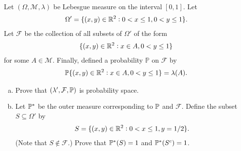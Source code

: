 \begin{problem}
	Let $ (\Omega, \mathcal{M},\lambda) $ be Lebesgue measure on the interval $ [0,1] $. Let
	\[ \Omega' = \{(x,y)\in \mathbb{R}^2: 0<x\leq 1, 0<y\leq 1\}. \]
	Let $ \mathcal{F} $ be the collection of all subsets of $ \Omega' $ of the form
	\[ \{(x,y)\in \mathbb{R}^2: x\in A, 0<y\leq 1\} \]
	for some $ A \in \mathcal{M} $. Finally, defined a probability $ \mathbb{P} $ on $ \mathcal{F} $ by
	\[ \mathbb{P}\{(x,y)\in\mathbb{R}^2: x\in A, 0<y\leq 1\} = \lambda(A). \]
	\begin{enumerate}[(a)]
		\item Prove that $ (\lambda', \mathcal{F},\mathbb{P}) $ is probability space.
		\item Let $ \mathbb{P}^* $ be the outer measure corresponding to $ \mathbb{P} $ and $ \mathcal{F} $. Define the subset $ S \subseteq \Omega' $ by
		\[ S = \{(x,y)\in \mathbb{R}^2: 0<x\leq 1, y = 1/2\}. \]
		(Note that $ S \notin \mathcal{F} $.) Prove that $ \mathbb{P}^*(S)=1 $ and $ \mathbb{P}^*(S^c)=1 $.
	\end{enumerate}

\end{problem}
